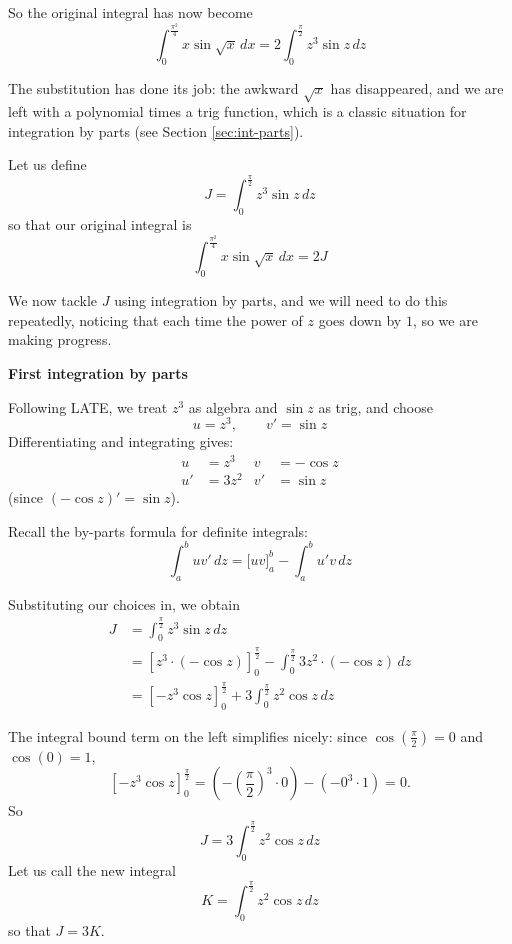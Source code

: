 \begin{solution}
    So the original integral has now become
    \[
        \int_0^{\frac{\pi^2}{4}} x \sin \sqrt{x} \, dx
        = 2 \int_0^{\frac{\pi}{2}} z^3 \sin z \, dz
    \]

    The substitution has done its job: the awkward $\sqrt{x}$ has disappeared, and we are left with a polynomial times a trig function, 
    which is a classic situation for integration by parts (see Section \ref{sec:int-parts}).

    Let us define
    \[
        J = \int_0^{\frac{\pi}{2}} z^3 \sin z \, dz
    \]
    so that our original integral is
    \[
        \int_0^{\frac{\pi^2}{4}} x \sin \sqrt{x} \, dx = 2J
    \]

    We now tackle $J$ using integration by parts, and we will need to do this repeatedly, noticing that each time the power of $z$ goes down by $1$, 
    so we are making progress.

    \medskip
    \noindent\textbf{First integration by parts}

    Following LATE, we treat $z^3$ as algebra and $\sin z$ as trig, and choose
    \[
        u = z^3, \qquad v' = \sin z
    \]
    Differentiating and integrating gives:
    \begin{align*}
        u &= z^3            & v &= -\cos z \\
        u' &= 3z^2          & v' &= \sin z
    \end{align*}
    (since $( -\cos z )' = \sin z$).

    Recall the by-parts formula for definite integrals:
    \[
        \int_a^b u v' \, dz = \big[uv\big]_a^b - \int_a^b u' v \, dz
    \]

    Substituting our choices in, we obtain
    \begin{align*}
        J &= \int_0^{\frac{\pi}{2}} z^3 \sin z \, dz \\
          &= \left[ z^3 \cdot (-\cos z) \right]_0^{\frac{\pi}{2}} - \int_0^{\frac{\pi}{2}} 3z^2 \cdot (-\cos z) \, dz \\
          &= \left[ -z^3 \cos z \right]_0^{\frac{\pi}{2}} + 3 \int_0^{\frac{\pi}{2}} z^2 \cos z \, dz \tag{rearranging the integral}
    \end{align*}

    The integral bound term on the left simplifies nicely: since $\cos\left(\frac{\pi}{2}\right) = 0$ and $\cos(0)=1$,
    \[
        \left[ -z^3 \cos z \right]_0^{\frac{\pi}{2}} = \left(-\left(\frac{\pi}{2}\right)^3 \cdot 0\right) - \left(-0^3 \cdot 1\right) = 0.
    \]
    So
    \[
        J = 3 \int_0^{\frac{\pi}{2}} z^2 \cos z \, dz
    \]
    Let us call the new integral
    \[
        K = \int_0^{\frac{\pi}{2}} z^2 \cos z \, dz
    \]
    so that $J = 3K$.


\end{solution}
